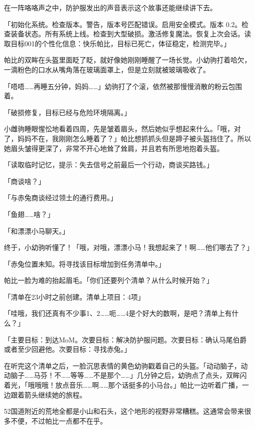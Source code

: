 \horizonline


在一阵咯咯声之中，防护服发出的声音表示这个故事还能继续讲下去。

「{\mt 初始化系统。检查版本。警告，版本号匹配错误。启用安全模式。版本 0.2。检查装备状态。所有系统上线。检查到大型破损。激活修复魔法。恢复上次会话。读取目标001的个性化信息：快乐帕比，目标已死亡，体征稳定，检测完毕。}」

帕比的双眸在头盔里面眨了眨，就好像她刚刚睡醒了一场长觉。小幼驹打着哈欠，一滴粉色的口水从嘴角落在玻璃面罩上，但是立刻就被玻璃吸收了。

「唔唔……再睡五分钟，妈妈……」幼驹打了个滚，依然被那慢慢消散的粉云包围着。

「{\mt 破损修复，目标已经与危险环境隔离。}」

小雌驹睡眼惺忪地看着四周，先是皱着眉头，然后她似乎想起来什么。「哦，对了，妈妈不在，我刚刚怎么睡着了？」帕比想抓抓头但是蹄子被头盔挡住了。所以她眉头皱得更深了，非常不开心地耸了耸肩，并且若有所思地抱着头盔。

「{\mt 读取临时记忆，提示：失去信号之前最后一个行动，商谈买路钱。}」

「商谈啥？」

「{\mt 与赤兔商谈经过领土的通行费用。}」

「鱼翅……啥？」

「{\mt 和漂漂小马聊天。}」

终于，小幼驹听懂了！「哦，对哦，漂漂小马！我想起来了！啊……他们哪去了？」

「{\mt 赤兔位置未知。将寻找该目标增加到任务清单中。}」

帕比一脸为难的抬起眉毛。「你们还要列个清单？从什么时候开始？」

「{\mt 清单在23小时之前创建。清单上项目：4项}」

「哇哦，我们还真有不少事1、2……呃……4是个好大的数啊，是吧？清单上有什么？」

「{\mt 主要目标：到达MoM。次要目标：解决防护服问题。次要目标：确认马尾伯爵或者至少回避他。次要目标：寻找赤兔。}」

在听完这个清单之后，一脸沉思表情的黄色幼驹戳着自己的头盔。「动动脑子，动动脑子……马芬！不……等等……不是那个……」几分钟之后，幼驹点了点头，双眸闪着光，「哦哦哦！放点音乐……啊……那个话挺多的小马台。」帕比一边听着广播，一边跟着箭头继续她的旅程。

52国道附近的荒地全都是小山和石头，这个地形的视野非常糟糕。这通常会带来很多不便，不过帕比一点都不在乎。

